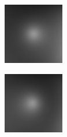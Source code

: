 \documentclass[11pt]{article}
\begin{document}
\begin{figure}[!hbt]
\centering
  \vspace{-5pt}
  \begin{subfigure}[h]{0.3\textwidth}
    \centering
    \includegraphics[width = \textwidth]{../synth-images/im1.png}
  \end{subfigure} 
    \begin{subfigure}[h]{0.3\textwidth}
    \centering
    \includegraphics[width = \textwidth]{../synth-images/im2.png}

\end{subfigure}
\end{figure}
\end{document}
